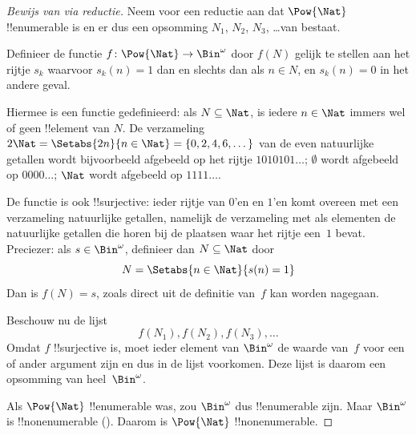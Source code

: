 \documentclass[../../../include/open-logic-section]{subfiles}
\begin{document}
\begin{proof}[Bewijs van {} via reductie]
Neem voor een reductie aan dat $\Pow{\Nat}$ !!{enumerable} is en er
dus een opsomming $N_{1}$, $N_{2}$, $N_{3}$, \dots van bestaat.

Definieer de functie $f \colon \Pow{\Nat} \to \Bin^\omega$ door
$f(N)$ gelijk te stellen aan het rijtje $s_{k}$ waarvoor $s_{k}(n) =
1$ dan en slechts dan als $n \in N$, en $s_k(n) = 0$ in het andere
geval.

Hiermee is een functie gedefinieerd: als $N \subseteq \Nat$, is iedere
$n \in \Nat$ immers wel of geen !!{element} van $N$. De verzameling
$2\Nat = \Setabs{2n}{n \in \Nat} = \{0,2, 4, 6, \dots\}$ van de even
natuurlijke getallen wordt bijvoorbeeld afgebeeld op het rijtje
$1010101\dots$; $\emptyset$ wordt afgebeeld op $0000\dots$; $\Nat$
wordt afgebeeld op $1111\dots$.

De functie is ook !!{surjective}: ieder rijtje van $0$'en en $1$'en
komt overeen met een verzameling natuurlijke getallen, namelijk de
verzameling met als elementen de natuurlijke getallen die horen bij
de plaatsen waar het rijtje een~$1$ bevat. Preciezer: als $s \in
\Bin^\omega$, definieer dan $N \subseteq \Nat$ door
\[
N = \Setabs{n \in \Nat}{s(n) = 1}
\]
Dan is $f(N) = s$, zoals direct uit de definitie van~$f$ kan worden
nagegaan.

Beschouw nu de lijst
\[
f(N_1), f(N_2), f(N_3), \dots
\]
Omdat $f$ !!{surjective} is, moet ieder element van $\Bin^\omega$ de
waarde van~$f$ voor een of ander argument zijn en dus in de lijst
voorkomen.
Deze lijst is daarom een opsomming van heel~$\Bin^\omega$.

Als $\Pow{\Nat}$ !!{enumerable} was, zou $\Bin^\omega$ dus
!!{enumerable} zijn. Maar $\Bin^\omega$ is !!{nonenumerable}
(). Daarom is $\Pow{\Nat}$
!!{nonenumerable}.
\end{proof}

\end{document}
